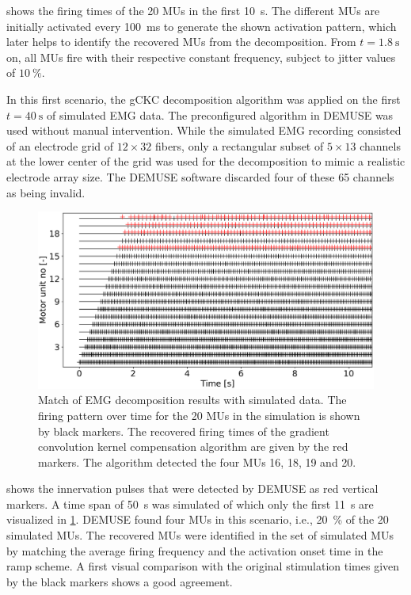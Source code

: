  shows the firing times of the 20 MUs in the first \SI{10}{\second}. The different MUs are initially activated every \SI{100}{\ms} to generate the shown  activation pattern, which later helps to identify the recovered MUs from the decomposition.  From $t=\SI{1.8}{\second}$ on, all MUs fire with their respective constant frequency, subject to jitter values of $\SI{10}{\percent}$.

In this first scenario, the gCKC decomposition algorithm was applied on the first $t=\SI{40}{\second}$ of simulated EMG data. The preconfigured algorithm in DEMUSE was used without manual intervention. While the simulated EMG recording consisted of an electrode grid of $12 \times 32$ fibers, only a rectangular subset of $5\times 13$ channels at the lower center of the grid was used for the decomposition to mimic a realistic electrode array size. The DEMUSE software discarded four of these 65 channels as being invalid.

\begin{figure}
  \centering%
  \includegraphics[width=\textwidth]{images/results/application/emg_20mus-50s-old2.pdf}%
  \caption{Match of EMG decomposition results with simulated data. The firing pattern over time for the 20 MUs in the simulation is shown by black markers. The recovered firing times of the gradient convolution kernel compensation algorithm are given by the red markers. The algorithm detected the four MUs 16, 18, 19 and 20.}%
  \label{fig:emg_20mus-50s-old2}%
\end{figure}

 shows the innervation pulses that were detected by DEMUSE as red vertical markers. A time span of \SI{50}{\s} was simulated of which only the first \SI{11}{\s} are visualized in \cref{fig:emg_20mus-50s-old2}. DEMUSE found four MUs in this scenario, i.e., \SI{20}{\percent} of the 20 simulated MUs. 
The recovered MUs were identified in the set of simulated MUs by matching the  average firing frequency and the activation onset time in the ramp scheme. A first visual comparison with the original stimulation times given by the black markers shows a good agreement.

